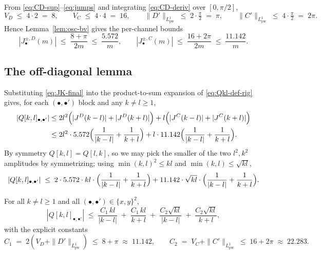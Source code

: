 From \eqref{eq:CD-sup}--\eqref{eq:jumps} and integrating
\eqref{eq:CD-deriv} over $[0,\pi/2]$,
\begin{equation}\label{eq:VK-LK}
   V_{D} \;\leq\; 4\cdot 2 \;=\; 8, \qquad V_{C} \;\leq\; 4 \cdot 4 \;=\; 16,
\qquad
   \|D'\|_{L^{1}_{\mathrm{pw}}} \;\leq\; 2 \cdot \tfrac{\pi}{2} \;=\; \pi,
\qquad
   \|C'\|_{L^{1}_{\mathrm{pw}}} \;\leq\; 4 \cdot \tfrac{\pi}{2} \;=\; 2\pi.
\end{equation}
Hence Lemma~\ref{lem:osc-bv} gives the per-channel bounds
\begin{equation}\label{eq:JK-final}
   |J_{\bullet}^{\pm,D}(m)| \;\leq\; \frac{8 + \pi}{2m} \;\leq\; \frac{5.572}{m},
   \qquad
   |J_{\bullet}^{\pm,C}(m)| \;\leq\; \frac{16 + 2\pi}{2m}
                                   \;\leq\; \frac{11.142}{m}.
\end{equation}

\subsection{The off-diagonal lemma}

Substituting \eqref{eq:JK-final} into the product-to-sum expansion
of \eqref{eq:Qkl-def-rig} gives, for each $(\bullet,\bullet')$
block and any $k \ne l \geq 1$,
\begin{align*}
   |Q[k,l]_{\bullet,\bullet'}|
   &\leq
   2l^{2}\Bigl(|J^{D}(k-l)| + |J^{D}(k+l)|\Bigr)
   + l\Bigl(|J^{C}(k-l)| + |J^{C}(k+l)|\Bigr) \\
   &\leq
   2l^{2}\cdot 5.572\Bigl(\frac{1}{|k-l|}+\frac{1}{k+l}\Bigr)
   + l\cdot 11.142\Bigl(\frac{1}{|k-l|}+\frac{1}{k+l}\Bigr).
\end{align*}
By symmetry $Q[k,l] = Q[l,k]$, so we may pick the smaller of the two
$l^{2}, k^{2}$ amplitudes by symmetrizing; using
$\min(k,l)^{2} \leq kl$ and $\min(k,l) \leq \sqrt{kl}$,
\begin{equation}\label{eq:Qkl-symmetrized}
   |Q[k,l]_{\bullet,\bullet'}|
   \;\leq\;
   2 \cdot 5.572 \cdot kl \cdot
        \Bigl(\frac{1}{|k-l|}+\frac{1}{k+l}\Bigr)
   + 11.142 \cdot \sqrt{kl} \cdot
        \Bigl(\frac{1}{|k-l|}+\frac{1}{k+l}\Bigr).
\end{equation}

\begin{lemma}\label{lem:offdiag-rigorous}
For all $k \ne l \geq 1$ and all $(\bullet,\bullet') \in \{x,y\}^{2}$,
\begin{equation}\label{eq:offdiag-final}
   |Q[k,l]_{\bullet,\bullet'}|
   \;\leq\;
   \frac{C_{1}\, kl}{|k-l|}
   \;+\;
   \frac{C_{1}\, kl}{k+l}
   \;+\;
   \frac{C_{2}\sqrt{kl}}{|k-l|}
   \;+\;
   \frac{C_{2}\sqrt{kl}}{k+l},
\end{equation}
with the explicit constants
\begin{equation}\label{eq:offdiag-constants}
   C_{1} \;=\; 2(V_{D}+\|D'\|_{L^{1}_{\mathrm{pw}}})
         \;\leq\; 8 + \pi \;\approx\; 11.142,
   \qquad
   C_{2} \;=\;  V_{C}+\|C'\|_{L^{1}_{\mathrm{pw}}}
         \;\leq\; 16 + 2\pi \;\approx\; 22.283.
\end{equation}
\end{lemma}


